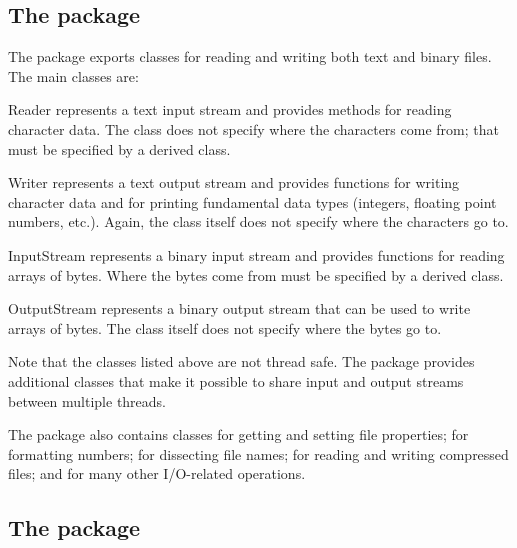 \documentclass[a4paper,10pt]{article}
\begin{document}
\subsection{The  package}

The  package exports classes for reading and writing both text
and binary files. The main classes are:
\begin{Description}[\Code]

\item[Reader] \label{class:Reader} represents a text input stream and
  provides methods for reading character data. The  class
  does not specify where the characters come from; that must be specified
  by a derived class.

\item[Writer] \label{class:Writer} represents a text output stream and
  provides functions for writing character data and for printing
  fundamental data types (integers, floating point numbers, etc.). Again,
  the  class itself does not specify where the characters go
  to.

\item[InputStream] represents a binary input stream and provides
  functions for reading arrays of bytes. Where the bytes come from must
  be specified by a derived class.

\item[OutputStream] represents a binary output stream that can be used to
  write arrays of bytes. The  class itself does not
  specify where the bytes go to.

\end{Description}
Note that the classes listed above are not thread safe. The 
package provides additional classes that make it possible to share input
and output streams between multiple threads.

The  package also contains classes for getting and setting file
properties; for formatting numbers; for dissecting file names; for
reading and writing compressed files; and for many other I/O-related
operations.


\subsection{The  package}
\end{document}
